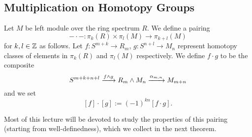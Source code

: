 
\subsection{Multiplication on Homotopy Groups}


Let $M$ be left module over the ring spectrum $R$. We define a pairing
\[-\cdot-:\pi_k(R)\times\pi_l(M)\to\pi_{k+l}(M)\]
for $k,l\in{\mathbb Z}$ as follows. Let $f:S^{m+k}\to R_m$, $g:S^{n+l}\to M_n$ represent homotopy classes of elements in $\pi_k(R)$ and $\pi_l(M)$ respectively. We define $f\cdot g$ to be the composite
\[S^{m+k+n+l}\xrightarrow{f\wedge g}R_m\wedge M_n\xrightarrow{\alpha_{m,n}}M_{m+n}\]
and we set
\[[f]\cdot[g]:=(-1)^{kn}[f\cdot g].\]

Most of this lecture will be devoted to study the properties of this pairing (starting from well-definedness), which we collect in the next theorem.

